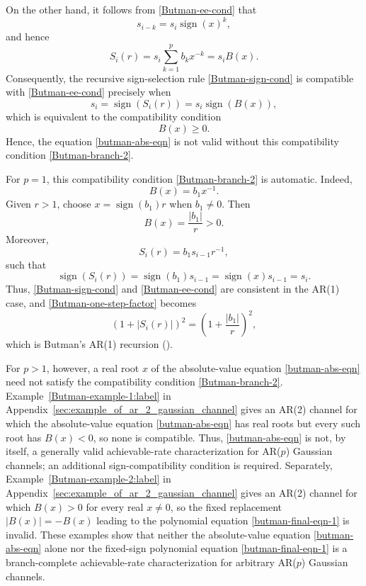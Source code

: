 \documentclass[12pt]{article}
\begin{document}
On the other hand, it follows from \eqref{Butman-ee-cond} that
\[
    s_{i-k}=s_i\operatorname{sign}(x)^k,
\]
and hence
\[
    S_i(r) = s_i\sum_{k=1}^{p} b_k x^{-k} = s_i B(x).
\]
Consequently, the recursive sign-selection rule \eqref{Butman-sign-cond} is compatible with \eqref{Butman-ee-cond} precisely when
\begin{equation*}
    s_i=\operatorname{sign}(S_i(r)) = s_i\operatorname{sign}(B(x)),
\end{equation*}
which is equivalent to the compatibility condition
\begin{equation}\label{Butman-branch-2}
    B(x)\ge 0.
\end{equation}
Hence, the equation \eqref{butman-abs-eqn} is not valid without this compatibility condition \eqref{Butman-branch-2}. 

For $p=1$, this compatibility condition \eqref{Butman-branch-2} is automatic. Indeed,
$$
    B(x)=b_1x^{-1}.
$$
Given \(r>1\), choose $x=\operatorname{sign}(b_1)r$ when \(b_1\neq0\). Then
\[
    B(x)=\frac{|b_1|}{r}>0.
\]
Moreover,
\[
    S_i(r)=b_1s_{i-1}r^{-1},
\]
such that
\[
    \operatorname{sign}(S_i(r)) = \operatorname{sign}(b_1)s_{i-1} = \operatorname{sign}(x)s_{i-1} = s_i.
\]
Thus, \eqref{Butman-sign-cond} and \eqref{Butman-ee-cond} are consistent in the AR(1) case, and \eqref{Butman-one-step-factor} becomes
\[
    \left(1+|S_i(r)|\right)^2 = \left(1+\frac{|b_1|}{r}\right)^2,
\]
which is Butman's AR(1) recursion (\cite[Equation (4)]{butman1976linear}). 

For $p>1$, however, a real root $x$ of the absolute-value equation \eqref{butman-abs-eqn} need not satisfy the compatibility condition \eqref{Butman-branch-2}. Example~\ref{Butman-example-1:label} in Appendix~\ref{sec:example_of_ar_2_gaussian_channel} gives an AR(2) channel for which the absolute-value equation \eqref{butman-abs-eqn} has real roots but every such root has $B(x)<0$, so none is compatible. Thus, \eqref{butman-abs-eqn} is not, by itself, a generally valid achievable-rate characterization for AR($p$) Gaussian channels; an additional sign-compatibility condition is required. Separately, Example~\ref{Butman-example-2:label} in Appendix~\ref{sec:example_of_ar_2_gaussian_channel} gives an AR(2) channel for which $B(x)>0$ for every real $x\neq 0$, so the fixed replacement $|B(x)|=-B(x)$ leading to the polynomial equation \eqref{butman-final-eqn-1} is invalid. These examples show that neither the absolute-value equation \eqref{butman-abs-eqn} alone nor the fixed-sign polynomial equation \eqref{butman-final-eqn-1} is a branch-complete achievable-rate characterization for arbitrary AR($p$) Gaussian channels.
\end{document}
